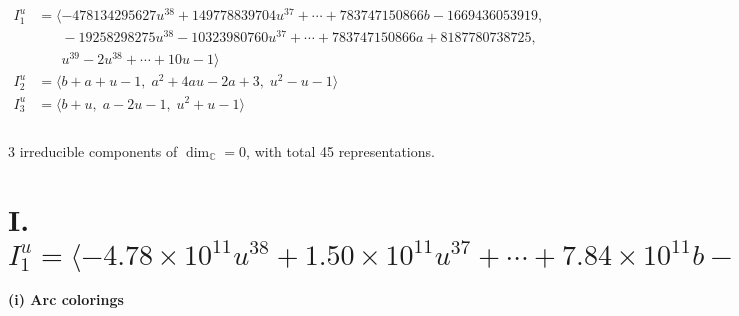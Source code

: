 \documentclass[1p]{elsarticle_modified}
\theoremstyle{definition}
\begin{document}
\begin{align*}
I^u_{1}&=\langle 
-478134295627 u^{38}+149778839704 u^{37}+\cdots+783747150866 b-1669436053919,\\
\phantom{I^u_{1}}&\phantom{= \langle  }-19258298275 u^{38}-10323980760 u^{37}+\cdots+783747150866 a+8187780738725,\\
\phantom{I^u_{1}}&\phantom{= \langle  }u^{39}-2 u^{38}+\cdots+10 u-1\rangle \\
I^u_{2}&=\langle 
b+a+u-1,\;a^2+4 a u-2 a+3,\;u^2- u-1\rangle \\
I^u_{3}&=\langle 
b+u,\;a-2 u-1,\;u^2+u-1\rangle \\
\\
\end{align*}
\raggedright * 3 irreducible components of $\dim_{\mathbb{C}}=0$, with total 45 representations.\\
\newpage
\renewcommand{\arraystretch}{1}
\centering \section*{I. $I^u_{1}= \langle -4.78\times10^{11} u^{38}+1.50\times10^{11} u^{37}+\cdots+7.84\times10^{11} b-1.67\times10^{12},\;-1.93\times10^{10} u^{38}-1.03\times10^{10} u^{37}+\cdots+7.84\times10^{11} a+8.19\times10^{12},\;u^{39}-2 u^{38}+\cdots+10 u-1 \rangle$}
\flushleft \textbf{(i) Arc colorings}\\
\end{document}
